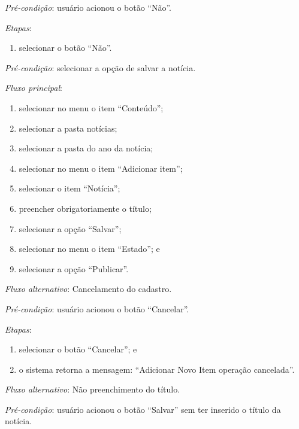 \documentclass[a4paper,12pt]{article}
\begin{document}
\noindent \textit{Pré-condição}: usuário acionou o botão ``Não''.

\noindent \textit{Etapas}:

\begin{enumerate}
    \item selecionar o botão ``Não''.
\end{enumerate}


\vspace{0.7cm}

\noindent \textit{Pré-condição}: selecionar a opção de salvar a notícia.

\noindent \textit{Fluxo principal}:

\begin{enumerate}
    \item selecionar no menu o item ``Conteúdo'';
    \item selecionar a pasta notícias;
    \item selecionar a pasta do ano da notícia;
    \item selecionar no menu o item ``Adicionar item'';
    \item selecionar o item ``Notícia'';
    \item preencher obrigatoriamente o título;
    \item selecionar a opção ``Salvar'';
    \item selecionar no menu o item ``Estado''; e
    \item selecionar a opção ``Publicar''.
\end{enumerate}

\noindent \textit{Fluxo alternativo}: Cancelamento do cadastro.

\noindent \textit{Pré-condição}:  usuário acionou o botão ``Cancelar''.

\noindent \textit{Etapas}:

\begin{enumerate}
    \item selecionar o botão ``Cancelar''; e
    \item o sistema retorna a mensagem: ``Adicionar Novo Item operação cancelada''.
\end{enumerate}

\noindent \textit{Fluxo alternativo}: Não preenchimento do título.

\noindent \textit{Pré-condição}: usuário acionou o botão ``Salvar'' sem ter inserido o título da notícia.
\end{document}
